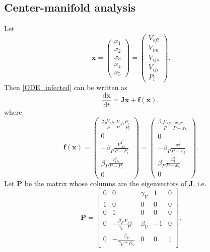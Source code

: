\documentclass{article}
\newcommand{\md}{\mathrm{d}}
\newcommand{\mat}[1]{\mathbf{#1}}
\renewcommand{\vec}[1]{\mathbf{#1}}
\begin{document}
\subsection{Center-manifold analysis}

Let
\begin{equation}
  \vec{x} =
  \begin{pmatrix}
    x_1 \\ x_2 \\ x_3 \\ x_4 \\ x_5
  \end{pmatrix}
  = 
  \begin{pmatrix}
    V_{sfi} \\ V_{im} \\ V_{ifs} \\ V_{ifi} \\ P_i
  \end{pmatrix}.
\end{equation}
Then \eqref{ODE_infected} can be written as
\begin{equation}
  \frac{\md \vec{x}}{\md t} = \mat{J} \vec{x} + \vec{f}(\vec{x}),
\end{equation}
where
\begin{equation}
  \vec{f}(\vec{x}) =
  \begin{pmatrix}
    \frac{\beta_P V_{sfs}}{P} \frac{V_{ifs} P_i}{P - P_i}
    \\
    0
    \\
    - \beta_P \frac{V_{ifs}^2}{P - P_i}
    \\
    \beta_P \frac{V_{ifs}^2}{P - P_i}
    \\
    0
  \end{pmatrix}
  =
  \begin{pmatrix}
    \frac{\beta_P V_{sfs}}{P} \frac{x_3 x_5}{P - x_5}
    \\
    0
    \\
    - \beta_P \frac{x_3^2}{P - x_5}
    \\
    \beta_P \frac{x_3^2}{P - x_5}
    \\
    0
  \end{pmatrix}.
\end{equation}
Let $\mat{P}$ be the matrix whose columns are the eigenvectors of
$\mat{J}$, i.e.
\begin{equation}
  \mat{P} =
  \begin{bmatrix}
    0 & 0 & \gamma_V & 1 & 0 \\
    1 & 0 & 0 & 0 & 0 \\
    0 & 1 & 0 & 0 & 0 \\
    0 & - \frac{\beta_P}{\gamma_V} \frac{V_{sfs}}{P} & \beta_V & -1 & 0 \\
    0 & - \frac{\beta_P}{\gamma_V + \mu_V} & 0 & 0 & 1
  \end{bmatrix}.
\end{equation}
\end{document}
